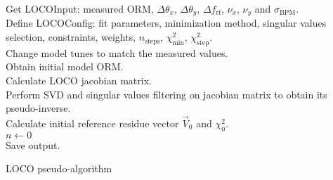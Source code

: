 \begin{algorithm}
\SetAlgoLined
{}
 Get LOCOInput: measured ORM, $\Delta \theta_x$, $\Delta \theta_y$, $\Delta f_{\mathrm{rf}}$, $\nu_x$, $\nu_y$ and $\sigma_{\mathrm{BPM}}$.\\
 Define LOCOConfig: fit parameters, minimization method, singular values selection, constraints, weights, $n_{\mathrm{steps}}$, $\chi^2_{\mathrm{min}}$, $\chi^2_{\mathrm{step}}$.\\
 Change model tunes to match the measured values.\\
 Obtain initial model ORM.\\
 Calculate LOCO jacobian matrix.\\
 Perform SVD and singular values filtering on jacobian matrix to obtain its pseudo-inverse.\\
 Calculate initial reference residue vector $\vec{V}_0$ and $\chi^2_0$.\\
 $n \leftarrow 0$ \\
 Save output.
 \caption{LOCO pseudo-algorithm}
 \label{algo:loco}
\end{algorithm}

